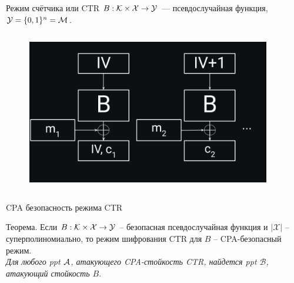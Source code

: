 \documentclass[usenames,dvipsnames,8pt,aspectratio=169]{beamer}
\begin{document}
\begin{frame}{Режим счётчика или CTR}
\Large
$B: \mathcal{K} \times \mathcal{X} \rightarrow \mathcal{Y}$ --- псевдослучайная функция, $\mathcal{Y} = \{0,1\}^n = \mathcal{M}$.
\begin{columns}
	\begin{column}{0.4\textwidth}
		\begin{figure}
			\hspace{-4em}
			\includegraphics[scale=0.2]{CTR}
		\end{figure}
	\end{column}
	\begin{column}{0.4\textwidth}
	
	\end{column}
	\end{columns}




\end{frame}



\begin{frame}{CPA безопасность режима CTR}
\LARGE

{\color{Orange} Теорема.} Если $B: \mathcal{K} \times \mathcal{X} \rightarrow \mathcal{Y} $ -- {\color{Orange} безопасная псевдослучайная функция} и $|\mathcal{X}|$ -- суперполиномиально, то режим шифрования CTR для $B$ --  {\color{Orange} CPA-безопасный} режим.\\[10pt]


\textit{Для любого ppt $\mathcal{A}$, атакующего CPA-стойкость CTR, найдется ppt $\mathcal{B}$, атакующий стойкость $B$}. \\[10pt]



\end{frame}
\end{document}

